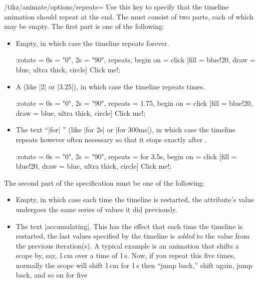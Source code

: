 \begin{key}{/tikz/animate/options/repeats=}
  Use this key to specify that the timeline animation should repeat at
  the end. The  must consist of two parts, each of
  which may be empty. The first part is one of the following:
  \begin{itemize}
  \item Empty, in which case the timeline repeats forever.
\begin{codeexample}[animation list={1,2,3,4,5}]
\tikz \node :rotate = { 0s = "0", 2s = "90",
                        repeats, begin on = click }
    [fill = blue!20, draw = blue, ultra thick, circle] {Click me!}; 
\end{codeexample}
  \item A  (like |2| or |3.25|), in which case the
    timeline repeats  times.
\begin{codeexample}[animation list={1,2,3,4,5}]
\tikz \node :rotate = { 0s = "0", 2s = "90",
                        repeats = 1.75, begin on = click }
    [fill = blue!20, draw = blue, ultra thick, circle] {Click me!}; 
\end{codeexample}
  \item The text ``|for| '' (like |for 2s| or |for 300ms|),
    in which case the timeline repeats however often necessary so that
    it  stops exactly after .
\begin{codeexample}[animation list={1,2,3,4,5}]
\tikz \node :rotate = { 0s = "0", 2s = "90",
                        repeats = for 3.5s, begin on = click }
    [fill = blue!20, draw = blue, ultra thick, circle] {Click me!}; 
\end{codeexample}
  \end{itemize}
  The second part of the specification must be one of the following:
  \begin{itemize}
  \item Empty, in which case each time the timeline is restarted, the
    attribute's value undergoes the same series of values it did
    previously.
  \item The text |accumulating|. This has the effect that each time
    the timeline is restarted, the last values specified by the
    timeline is \emph{added} to the value from the previous
    iteration(s). A typical example is an animation that shifts a
    scope by, say, 1\,cm over a time of 1\,s. Now, if you repeat this
    five times, normally the scope will shift 1\,cm for 1\,s then
    ``jump back,'' shift again, jump back, and so on for five

\end{itemize}
\end{key}
